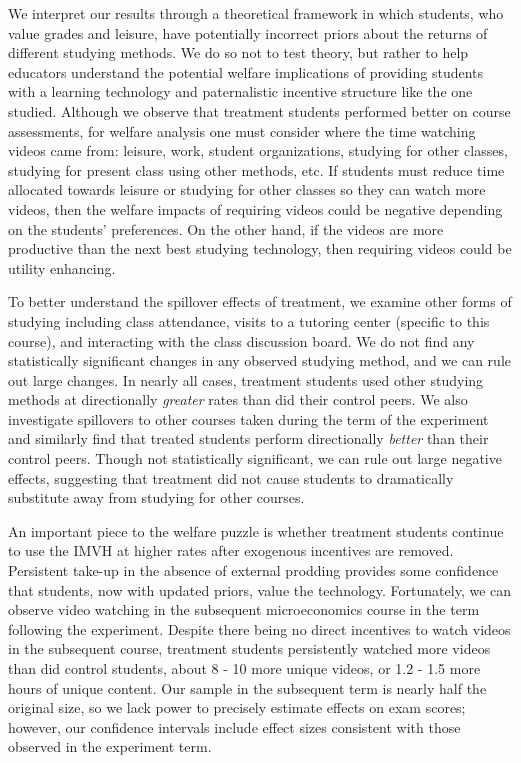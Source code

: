\documentclass[12pt]{article}
\begin{document}
We interpret our results through a theoretical framework in which students, who value grades and leisure, have potentially incorrect priors about the returns of different studying methods. We do so not to test theory, but rather to help educators understand the potential welfare implications of providing students with a learning technology and paternalistic incentive structure like the one studied. Although we observe that treatment students performed better on course assessments, for welfare analysis one must consider where the time watching videos came from: leisure, work, student organizations, studying for other classes, studying for present class using other methods, etc. If students must reduce time allocated towards leisure or studying for other classes so they can watch more videos, then the welfare impacts of requiring videos could be negative depending on the students' preferences. On the other hand, if the videos are more productive than the next best studying technology, then requiring videos could be utility enhancing.

To better understand the spillover effects of treatment, we examine other forms of studying including class attendance, visits to a tutoring center (specific to this course), and interacting with the class discussion board. We do not find any statistically significant changes in any observed studying method, and we can rule out large changes. In nearly all cases, treatment students used other studying methods at directionally \textit{greater} rates than did their control peers. We also investigate spillovers to other courses taken during the term of the experiment and similarly find that treated students perform directionally \textit{better} than their control peers. Though not statistically significant, we can rule out large negative effects, suggesting that treatment did not cause students to dramatically substitute away from studying for other courses.

An important piece to the welfare puzzle is whether treatment students continue to use the IMVH at higher rates after exogenous incentives are removed. Persistent take-up in the absence of external prodding provides some confidence that students, now with updated priors, value the technology. Fortunately, we can observe video watching in the subsequent microeconomics course in the term following the experiment. Despite there being no direct incentives to watch videos in the subsequent course, treatment students persistently watched more videos than did control students, about 8 - 10 more unique videos, or 1.2 - 1.5 more hours of unique content. Our sample in the subsequent term is nearly half the original size, so we lack power to precisely estimate effects on exam scores; however, our confidence intervals include effect sizes consistent with those observed in the experiment term.
\end{document}
